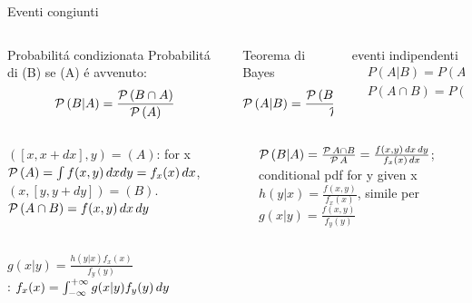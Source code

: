 \documentclass[asd-beamer.tex]{subfiles}
\begin{document}
\begin{frame}{Eventi congiunti}
\begin{columns}[T]
\begin{column}{0.3\textwidth}
\begin{block}{Probabilit\'a condizionata}
Probabilit\'a di (B) se (A) \'e avvenuto:
\[\operatorname{\mathcal{P}}{(B|A)}=\frac{\operatorname{\mathcal{P}}{(B\cap A)}}{\operatorname{\mathcal{P}}{(A)}}\]
\end{block}
\end{column}
\begin{column}{0.4\textwidth}
\begin{block}{Teorema di Bayes}
\[\operatorname{\mathcal{P}}{(A|B)}=\frac{\operatorname{\mathcal{P}}{(B|A)}\operatorname{\mathcal{P}}{(A)}}{\operatorname{\mathcal{P}}{(B)}}\]
\end{block}
\end{column}
\begin{column}{0.25\textwidth}
\begin{block}{eventi indipendenti}
\begin{align*}
&P(A|B)=P(A)\\
&P(A\cap B)=P(A)P(B)
\end{align*}		
\end{block}
\end{column}
\end{columns}
\begin{columns}[T]\begin{column}{0.5\textwidth}
\begin{block}{}
$([x,x+dx],y)=(A)$:  for x $\operatorname{\mathcal{P}}{(A)}=\int f(x,y)\,dxdy=f_x(x)\,dx$, $(x,[y,y+dy])=(B)$. $\operatorname{\mathcal{P}}{(A\cap B)}=f(x,y)\,dx\,dy$
\end{block}
\end{column} \begin{column}{0.5\textwidth}
\begin{block}{}
$\operatorname{\mathcal{P}}{(B|A)}=\frac{\operatorname{\mathcal{P}}{A\cap B}}{\operatorname{\mathcal{P}}{A}}=\frac{f(x,y)\,dx\,dy}{f_x(x)\,dx}$; conditional pdf for y given x $h(y|x)=\frac{f(x,y)}{f_x(x)}$, simile per $g(x|y)=\frac{f(x,y)}{f_y(y)}$
\end{block}
\end{column}\end{columns}
 $g(x|y)=\frac{h(y|x)f_x(x)}{f_y(y)}$\\
: $f_x(x)=\int_{-\infty}^{+\infty}{}g(x|y)f_y(y)\,dy$
\end{frame}
\end{document}
